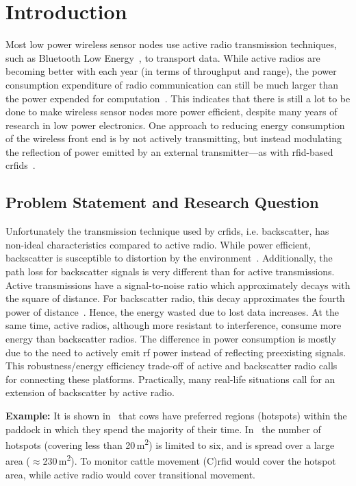\documentclass[conference,letterpaper,twoside,final,10pt]{IEEEtran}
\begin{document}
\setlength{\textfloatsep}{0pt}

\section{Introduction}
\label{sec:introduction}

Most low power wireless sensor nodes use active radio transmission techniques, such as Bluetooth Low Energy~\cite{gomez2012sensors}, to transport data.
While active radios are becoming better with each year (in terms of throughput and range), the power consumption expenditure of radio communication can still be much larger than the power expended for computation~\cite{fonseca2008quanto}.
This indicates that there is still a lot to be done to make wireless sensor nodes more power efficient, despite many years of research in low power electronics.
One approach to reducing energy consumption of the wireless front end is by not actively transmitting, but instead modulating the reflection of power emitted by an external transmitter---as with \ac{rfid}-based \acp{crfid}~\cite{sample2008im}.

\subsection{Problem Statement and Research Question}
\label{sec:introduction/problem}

Unfortunately the transmission technique used by \acp{crfid}, i.e. backscatter, has non-ideal characteristics compared to active radio.
While power efficient, backscatter is susceptible to distortion by the environment~\cite[Fig. 4]{zhang2012mobisys}.
Additionally, the path loss for backscatter signals is very different than for active transmissions.
Active transmissions have a signal-to-noise ratio which approximately decays with the square of distance.
For backscatter radio, this decay approximates the fourth power of distance~\cite[Sec. 2.2]{zhang2012mobisys}.
Hence, the energy wasted due to lost data increases.
At the same time, active radios, although more resistant to interference, consume more energy than backscatter radios.
The difference in power consumption is mostly due to the need to actively emit \ac{rf} power instead of reflecting preexisting signals.
This robustness/energy efficiency trade-off of active and backscatter radio calls for connecting these platforms.
Practically, many real-life situations call for an extension of backscatter by active radio.

\textbf{Example:} It is shown in~\cite{guo2009cows} that cows have preferred regions (hotspots) within the paddock in which they spend the majority of their time. In~\cite[Fig. 3]{guo2009cows} the number of hotspots (covering less than 20\,\si{\square\meter}) is limited to six, and is spread over a large area ($\approx$230\,\si{\square\meter}). To monitor cattle movement (C)\acs{rfid} would cover the hotspot area, while active radio would cover transitional movement.
\end{document}
